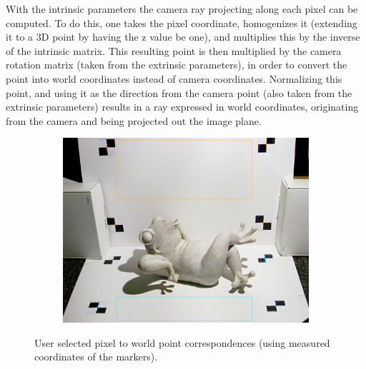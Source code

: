 \documentclass[10pt]{article}
\begin{document}
With the intrinsic parameters the camera ray projecting along each pixel can be computed. To do this, one takes the pixel coordinate, homogenizes it (extending it to a 3D point by having the z value be one), and multiplies this by the inverse of the intrinsic matrix. This resulting point is then multiplied by the camera rotation matrix (taken from the extrinsic parameters), in order to convert the point into world coordinates instead of camera coordinates. Normalizing this point, and using it as the direction from the camera point (also taken from the extrinsic parameters) results in a ray expressed in world coordinates, originating from the camera and being projected out the image plane. 
\begin{figure}[h!]
  \centering
    \begin{subfigure}[b]{0.47\linewidth}
           \centering
            \includegraphics[width=\linewidth]{user_select.jpg}
            
           
    \end{subfigure}
    \caption{User selected pixel to world point correspondences (using measured coordinates of the markers).}\label{userselected}
 \end{figure}
\end{document}
